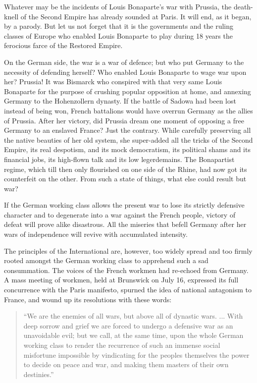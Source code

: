 \documentclass{article}
\begin{document}
Whatever may be the incidents of Louis Bonaparte’s war with Prussia, the
death-knell of the Second Empire has already sounded at Paris. It will
end, as it began, by a parody. But let us not forget that it is the
governments and the ruling classes of Europe who enabled Louis Bonaparte
to play during 18 years the ferocious farce of the Restored Empire.

On the German side, the war is a war of defence; but who put Germany to
the necessity of defending herself? Who enabled Louis Bonaparte to wage
war upon her? Prussia! It was Bismarck who conspired with that very same
Louis Bonaparte for the purpose of crushing popular opposition at home,
and annexing Germany to the Hohenzollern dynasty. If the battle of Sadowa
had been lost instead of being won, French battalions would have overrun
Germany as the allies of Prussia. After her victory, did Prussia dream one
moment of opposing a free Germany to an enslaved France? Just the
contrary. While carefully preserving all the native beauties of her old
system, she super-added all the tricks of the Second Empire, its real
despotism, and its mock democratism, its political shams and its financial
jobs, its high-flown talk and its low legerdemains. The Bonapartist
regime, which till then only flourished on one side of the Rhine, had now
got its counterfeit on the other. From such a state of things, what else
could result but war?

If the German working class allows the present war to lose its strictly
defensive character and to degenerate into a war against the French
people, victory of defeat will prove alike disastrous. All the miseries
that befell Germany after her wars of independence will revive with
accumulated intensity.

The principles of the International are, however, too widely spread and
too firmly rooted amongst the German working class to apprehend such a sad
consummation. The voices of the French workmen had re-echoed from Germany.
A mass meeting of workmen, held at Brunswick on July 16, expressed its
full concurrence with the Paris manifesto, spurned the idea of national
antagonism to France, and wound up its resolutions with these words:

\begin{quote}

``We are the enemies of all wars, but above all of dynastic wars. ... With
deep sorrow and grief we are forced to undergo a defensive war as an
unavoidable evil; but we call, at the same time, upon the whole German
working class to render the recurrence of such an immense social
misfortune impossible by vindicating for the peoples themselves the power
to decide on peace and war, and making them masters of their own
destinies.''

\end{quote}
\end{document}
